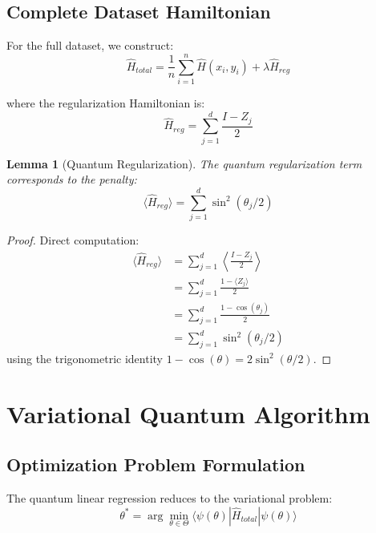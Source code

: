 \documentclass[11pt]{article}
\newtheorem{lemma}[theorem]{Lemma}
\begin{document}
\subsection{Complete Dataset Hamiltonian}

For the full dataset, we construct:
\begin{equation}
\hat{H}_{total} = \frac{1}{n} \sum_{i=1}^n \hat{H}(x_i, y_i) + \lambda \hat{H}_{reg}
\label{eq:total_hamiltonian}
\end{equation}

where the regularization Hamiltonian is:
\begin{equation}
\hat{H}_{reg} = \sum_{j=1}^d \frac{I - Z_j}{2}
\label{eq:regularization_hamiltonian}
\end{equation}

\begin{lemma}[Quantum Regularization]
The quantum regularization term corresponds to the penalty:
\begin{equation}
\langle \hat{H}_{reg} \rangle = \sum_{j=1}^d \sin^2(\theta_j/2)
\label{eq:quantum_regularization}
\end{equation}
\end{lemma}

\begin{proof}
Direct computation:
\begin{align}
\langle \hat{H}_{reg} \rangle &= \sum_{j=1}^d \left\langle \frac{I - Z_j}{2} \right\rangle \\
&= \sum_{j=1}^d \frac{1 - \langle Z_j \rangle}{2} \\
&= \sum_{j=1}^d \frac{1 - \cos(\theta_j)}{2} \\
&= \sum_{j=1}^d \sin^2(\theta_j/2)
\end{align}
using the trigonometric identity $1 - \cos(\theta) = 2\sin^2(\theta/2)$.
\end{proof}

\section{Variational Quantum Algorithm}

\subsection{Optimization Problem Formulation}

The quantum linear regression reduces to the variational problem:
\begin{equation}
\theta^* = \arg\min_{\theta \in \Theta} \langle \psi(\theta) | \hat{H}_{total} | \psi(\theta) \rangle
\label{eq:variational_problem}
\end{equation}
\end{document}
